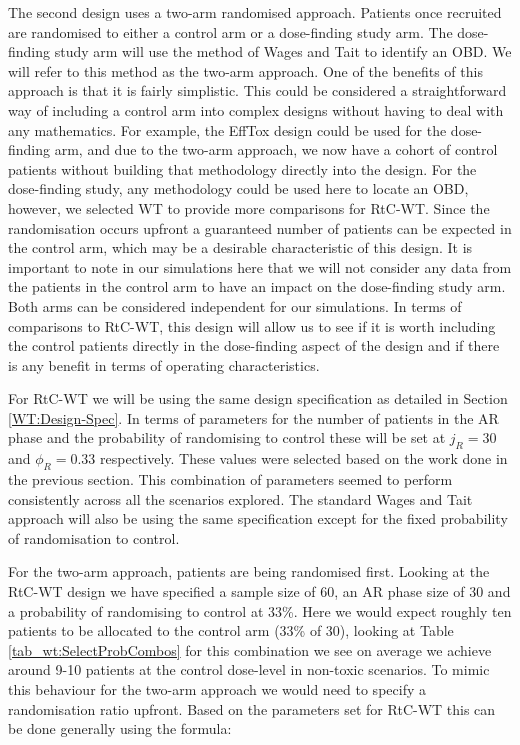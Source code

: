The second design uses a two-arm randomised approach. Patients once recruited are randomised to either a control arm or a dose-finding study arm. The dose-finding study arm will use the method of Wages and Tait to identify an OBD. We will refer to this method as the two-arm approach. One of the benefits of this approach is that it is fairly simplistic. This could be considered a straightforward way of including a control arm into complex designs without having to deal with any mathematics. For example, the EffTox design could be used for the dose-finding arm, and due to the two-arm approach, we now have a cohort of control patients without building that methodology directly into the design. For the dose-finding study, any methodology could be used here to locate an OBD, however, we selected WT to provide more comparisons for RtC-WT. Since the randomisation occurs upfront a guaranteed number of patients can be expected in the control arm, which may be a desirable characteristic of this design. It is important to note in our simulations here that we will not consider any data from the patients in the control arm to have an impact on the dose-finding study arm. Both arms can be considered independent for our simulations. In terms of comparisons to RtC-WT, this design will allow us to see if it is worth including the control patients directly in the dose-finding aspect of the design and if there is any benefit in terms of operating characteristics.  

For RtC-WT we will be using the same design specification as detailed in Section \ref{WT:Design-Spec}. In terms of parameters for the number of patients in the AR phase and the probability of randomising to control these will be set at $j_R = 30$ and $\phi_R = 0.33 $ respectively. These values were selected based on the work done in the previous section. This combination of parameters seemed to perform consistently across all the scenarios explored. The standard Wages and Tait approach will also be using the same specification except for the fixed probability of randomisation to control.

For the two-arm approach, patients are being randomised first. Looking at the RtC-WT design we have specified a sample size of 60, an AR phase size of 30 and a probability of randomising to control at 33\%. Here we would expect roughly ten patients to be allocated to the control arm (33\% of 30), looking at Table \ref{tab_wt:SelectProbCombos} for this combination we see on average we achieve around 9-10 patients at the control dose-level in non-toxic scenarios. To mimic this behaviour for the two-arm approach we would need to specify a randomisation ratio upfront. Based on the parameters set for RtC-WT this can be done generally using the formula:

